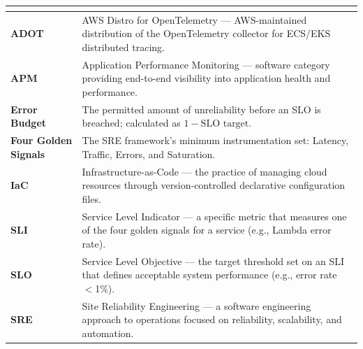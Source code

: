 {\begin{longtable}{@{\hspace{\tabcolsep}}>{\bfseries}p{}p{}@{\hspace{\tabcolsep}}}
\pagebreak
\multicolumn{2}{l}{\textit{\textbf{SRE and Observability}}} \\
\hline
ADOT & AWS Distro for OpenTelemetry — AWS-maintained distribution of the OpenTelemetry collector for ECS/EKS distributed tracing. \\
APM & Application Performance Monitoring — software category providing end-to-end visibility into application health and performance. \\
Error Budget & The permitted amount of unreliability before an SLO is breached; calculated as \(1 - \text{SLO target}\). \\
Four Golden Signals & The SRE framework's minimum instrumentation set: Latency, Traffic, Errors, and Saturation. \\
IaC & Infrastructure-as-Code — the practice of managing cloud resources through version-controlled declarative configuration files. \\
SLI & Service Level Indicator — a specific metric that measures one of the four golden signals for a service (e.g., Lambda error rate). \\
SLO & Service Level Objective — the target threshold set on an SLI that defines acceptable system performance (e.g., error rate $<$1\%). \\
SRE & Site Reliability Engineering — a software engineering approach to operations focused on reliability, scalability, and automation. \\


\end{longtable}}
